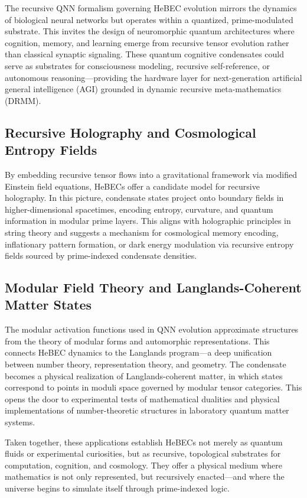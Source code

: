 \documentclass{article}
\theoremstyle{plain}
\begin{document}
The recursive QNN formalism governing HeBEC evolution mirrors the dynamics of biological neural networks but operates within a quantized, prime-modulated substrate. This invites the design of neuromorphic quantum architectures where cognition, memory, and learning emerge from recursive tensor evolution rather than classical synaptic signaling. These quantum cognitive condensates could serve as substrates for consciousness modeling, recursive self-reference, or autonomous reasoning—providing the hardware layer for next-generation artificial general intelligence (AGI) grounded in dynamic recursive meta-mathematics (DRMM).

\subsection{Recursive Holography and Cosmological Entropy Fields}

By embedding recursive tensor flows into a gravitational framework via modified Einstein field equations, HeBECs offer a candidate model for recursive holography. In this picture, condensate states project onto boundary fields in higher-dimensional spacetimes, encoding entropy, curvature, and quantum information in modular prime layers. This aligns with holographic principles in string theory and suggests a mechanism for cosmological memory encoding, inflationary pattern formation, or dark energy modulation via recursive entropy fields sourced by prime-indexed condensate densities.

\subsection{Modular Field Theory and Langlands-Coherent Matter States}

The modular activation functions used in QNN evolution approximate structures from the theory of modular forms and automorphic representations. This connects HeBEC dynamics to the Langlands program—a deep unification between number theory, representation theory, and geometry. The condensate becomes a physical realization of Langlands-coherent matter, in which states correspond to points in moduli space governed by modular tensor categories. This opens the door to experimental tests of mathematical dualities and physical implementations of number-theoretic structures in laboratory quantum matter systems.

\vspace{0.5em}
Taken together, these applications establish HeBECs not merely as quantum fluids or experimental curiosities, but as recursive, topological substrates for computation, cognition, and cosmology. They offer a physical medium where mathematics is not only represented, but recursively enacted—and where the universe begins to simulate itself through prime-indexed logic.
\end{document}
